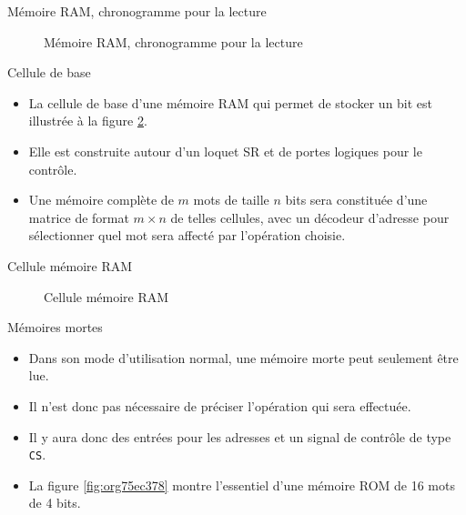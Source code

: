 \documentclass[presentation]{beamer}
\begin{document}
\begin{frame}[label={sec:org01f7206}]{Mémoire RAM, chronogramme pour la lecture}
\begin{figure}[htbp]
\centering

\caption{\label{fig:org4b78495}Mémoire RAM, chronogramme pour la lecture}
\end{figure}
\end{frame}

\begin{frame}[label={sec:org974c470}]{Cellule de base}
\begin{itemize}
\item La cellule de base d'une mémoire RAM qui permet de stocker un bit est illustrée à la figure \ref{fig:org11f9f57}.

\item Elle est construite autour d'un loquet SR et de portes logiques pour le contrôle.

\item Une mémoire complète de \(m\) mots de taille \(n\) bits sera constituée d'une matrice de format \(m \times n\) de telles cellules, avec un décodeur d'adresse pour sélectionner quel mot sera affecté par l'opération choisie.
\end{itemize}
\end{frame}

\begin{frame}[label={sec:orgc56e30d}]{Cellule mémoire RAM}
\begin{figure}[htbp]
\centering

\caption{\label{fig:org11f9f57}Cellule mémoire RAM}
\end{figure}
\end{frame}


\begin{frame}[label={sec:orga37052b},fragile]{Mémoires mortes}
 \begin{itemize}
\item Dans son mode d'utilisation normal, une mémoire morte peut seulement être lue.

\item Il n'est donc pas nécessaire de préciser l'opération qui sera effectuée.

\item Il y aura donc des entrées pour les adresses et un signal de contrôle de type \texttt{CS}.

\item La figure \ref{fig:org75ec378} montre l'essentiel d'une mémoire ROM de 16 mots de 4 bits.
\end{itemize}
\end{frame}
\end{document}
